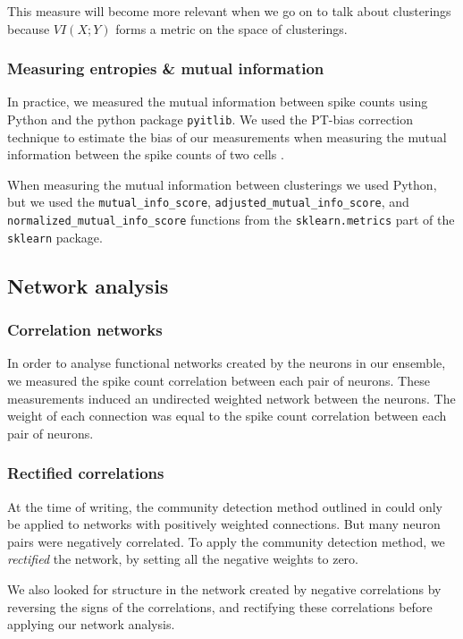 \documentclass[a4paper,12pt]{article}
\theoremstyle{definition}
\begin{document}
        This measure will become more relevant when we go on to talk about clusterings because $VI(X;Y)$ forms a metric on the space of clusterings.

        \subsubsection{Measuring entropies \& mutual information}
        In practice, we measured the mutual information between spike counts using Python and the python package \texttt{pyitlib}. We used the PT-bias correction technique to estimate the bias of our measurements when measuring the mutual information between the spike counts of two cells \cite{treves}.

        When measuring the mutual information between clusterings we used Python, but we used the \texttt{mutual\_info\_score}, \texttt{adjusted\_mutual\_info\_score}, and \texttt{normalized\_mutual\_info\_score} functions from the \texttt{sklearn.metrics} part of the \texttt{sklearn} package.

    \subsection{Network analysis}
        \subsubsection{Correlation networks}
        In order to analyse functional networks created by the neurons in our ensemble, we measured the spike count correlation between each pair of neurons. These measurements induced an undirected weighted network between the neurons. The weight of each connection was equal to the spike count correlation between each pair of neurons. 

        \subsubsection{Rectified correlations}
        At the time of writing, the community detection method outlined in \cite{humphries} could only be applied to networks with positively weighted connections. But many neuron pairs were negatively correlated. To apply the community detection method, we \textit{rectified} the network, by setting all the negative weights to zero.

        We also looked for structure in the network created by negative correlations by reversing the signs of the correlations, and rectifying these correlations before applying our network analysis.
\end{document}
